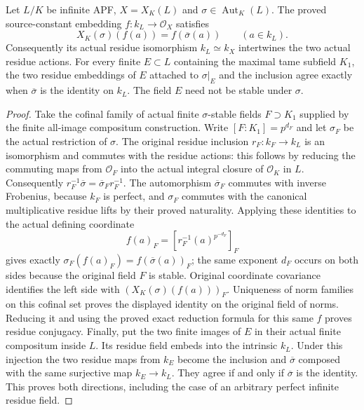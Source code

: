 \begin{lemma}
\label{fw:norm-action-residue-identification}
\leanok
Let $L/K$ be infinite APF, $X=X_K(L)$ and
$\sigma\in\operatorname{Aut}_K(L)$. The proved source-constant
embedding $f:k_L\to\mathcal O_X$ satisfies
\[
 X_K(\sigma)(f(a))=f(\overline\sigma(a))\qquad(a\in k_L).
\]
Consequently its actual residue isomorphism $k_L\simeq k_X$
intertwines the two actual residue actions. For every finite
$E\subset L$ containing the maximal tame subfield $K_1$, the two
residue embeddings of $E$ attached to $\sigma|_E$ and the inclusion
agree exactly when $\overline\sigma$ is the identity on $k_L$.
The field $E$ need not be stable under $\sigma$.
\end{lemma}
\begin{proof}
Take the cofinal family of actual finite $\sigma$-stable fields
$F\supset K_1$ supplied by the finite all-image compositum construction.
Write $[F:K_1]=p^{d_F}$ and let $\sigma_F$ be the actual restriction
of $\sigma$. The original residue inclusion $r_F:k_F\to k_L$ is an
isomorphism and commutes with the residue actions: this follows by
reducing the commuting maps from $\mathcal O_F$ into the actual
integral closure of $\mathcal O_K$ in $L$. Consequently
$r_F^{-1}\overline\sigma=\overline\sigma_F r_F^{-1}$.
The automorphism $\overline\sigma_F$ commutes with inverse Frobenius,
because $k_F$ is perfect, and $\sigma_F$ commutes with the canonical
multiplicative residue lifts by their proved naturality. Applying
these identities to the actual defining coordinate
\[
 f(a)_F=[r_F^{-1}(a)^{p^{-d_F}}]_F
\]
gives exactly
$\sigma_F(f(a)_F)=f(\overline\sigma(a))_F$; the same exponent
$d_F$ occurs on both sides because the original field $F$ is stable.
Original coordinate covariance identifies the left side with
$(X_K(\sigma)(f(a)))_F$. Uniqueness of norm families on this cofinal
set proves the displayed identity on the original field of norms.
Reducing it and using the proved exact reduction formula for this
same $f$ proves residue conjugacy. Finally, put the two finite images
of $E$ in their actual finite compositum inside $L$. Its residue field
embeds into the intrinsic $k_L$. Under this injection the two residue
maps from $k_E$ become the inclusion and $\overline\sigma$ composed
with the same surjective map $k_E\to k_L$. They agree if and only if
$\overline\sigma$ is the identity. This proves both directions,
including the case of an arbitrary perfect infinite residue field.
\end{proof}

